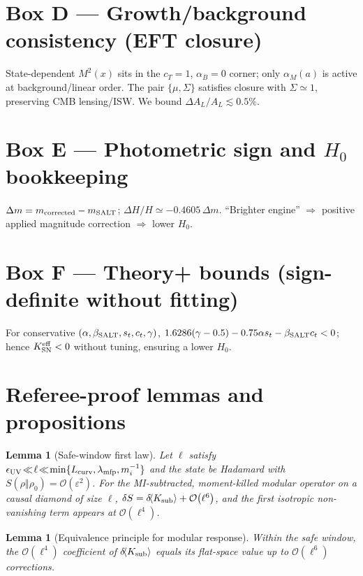 \documentclass[aps,prd,preprint,onecolumn,longbibliography,nofootinbib]{revtex4-2}
\theoremstyle{plain}
\newtheorem{lemma}[theorem]{Lemma}
\theoremstyle{remark}
\newcommand{\Hzero}{H_0}
\newcommand{\alM}{\alpha_{\!M}}
\newcommand{\alB}{\alpha_{\!B}}
\newcommand{\beS}{\beta_{\rm SALT}}
\newcommand{\order}[1]{\mathcal{O}\!\left(#1\right)}
\newcommand{\Sig}{\Sigma} %
\newcommand{\eps}{\varepsilon}
\begin{document}
\section*{Box D — Growth/background consistency (EFT closure)}
State-dependent $M^2(x)$ sits in the $c_T\!=\!1$, $\alB\!=\!0$ corner; only $\alM(a)$ is active at background/linear order. The pair $\{\mu,\Sig\}$ satisfies closure with $\Sig\simeq 1$, preserving CMB lensing/ISW. We bound $\Delta A_L/A_L\!\lesssim\!0.5\%$.

\section*{Box E — Photometric sign and $\Hzero$ bookkeeping}
$\Delta m=m_{\rm corrected}-m_{\rm SALT}$; $\Delta H/H\simeq-0.4605\,\Delta m$. “Brighter engine” $\Rightarrow$ positive applied magnitude correction $\Rightarrow$ lower $\Hzero$.

\section*{Box F — Theory+ bounds (sign-definite without fitting)}
For conservative $(\alpha,\beS,s_t,c_t,\gamma)$, $1.6286(\gamma-0.5)-0.75\alpha s_t-\beS c_t<0$; hence $K^{\rm eff}_{\rm SN}<0$ without tuning, ensuring a lower $\Hzero$.

\appendix

\section{Referee-proof lemmas and propositions}\label{app:lemmas}

\begin{lemma}[Safe-window first law]\label{lem:safe-window-first-law}
Let $\ell$ satisfy $\epsilon_{\rm UV}\!\ll\!\ell\!\ll\!\min\{L_{\rm curv},\lambda_{\rm mfp},m_i^{-1}\}$ and the state be Hadamard with $S(\rho\Vert\rho_0)=\order{\eps^2}$. For the MI-subtracted, moment-killed modular operator on a causal diamond of size $\ell$, $\delta S = \delta\!\langle K_{\rm sub}\rangle + \order{\ell^{6}}$, and the first isotropic non-vanishing term appears at $\order{\ell^4}$.
\end{lemma}

\begin{lemma}[Equivalence principle for modular response]\label{lem:EPMR}
Within the safe window, the $\order{\ell^4}$ coefficient of $\delta\!\langle K_{\rm sub}\rangle$ equals its flat-space value up to $\order{\ell^6}$ corrections.
\end{lemma}
\end{document}
